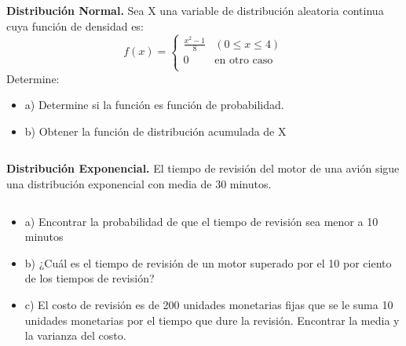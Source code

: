 \documentclass{../oxmathproblems}
\begin{document}
\begin{questions}
\miquestion \textbf {Distribución Normal.} 
Sea X una variable de distribución aleatoria continua cuya función de densidad es: 
\[   
f(x) = 
     \begin{cases}
       \frac{x^2 - 1}{8}  & (0 \leq x \leq 4)\\
       0 & \text{en otro caso} \\
     \end{cases}
\]
$$$$
Determine: 
\begin{itemize}
\item  a) Determine si la función es función de probabilidad. 
\item  b) Obtener la función de distribución acumulada de X 
\end{itemize}
$$$$

\miquestion \textbf {Distribución Exponencial.}
El tiempo de revisión del motor de una avión sigue una distribución exponencial con media de 30 minutos. 

$$$$
\begin{itemize}
\item  a) Encontrar la probabilidad de que el tiempo de revisión sea menor a 10 minutos
\item  b) ¿Cuál es el tiempo de revisión de un motor superado por el 10 por ciento de los tiempos de revisión?
\item  c) El costo de revisión es de 200 unidades monetarias fijas que se le suma 10 unidades monetarias por el tiempo que dure la revisión. Encontrar la media y la varianza del costo. 
\end{itemize}
$$$$

\end{questions}
\end{document}
